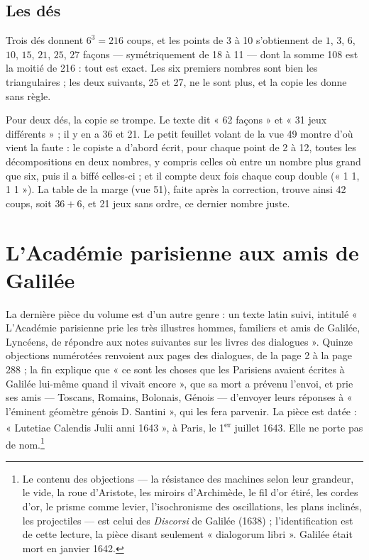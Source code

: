 \documentclass[11pt,a4paper]{article}
\begin{document}
\subsection*{Les dés}

Trois dés donnent $6^3 = 216$ coups, et les points de 3 à 10 s'obtiennent de
$1$, $3$, $6$, $10$, $15$, $21$, $25$, $27$ façons — symétriquement de 18 à 11 — dont la somme
108 est la moitié de 216 : tout est exact. Les six premiers nombres sont bien
les triangulaires ; les deux suivants, 25 et 27, ne le sont plus, et la copie
les donne sans règle.

Pour deux dés, la copie se trompe. Le texte dit « 62 façons » et « 31 jeux
différents » ; il y en a 36 et 21. Le petit feuillet volant de la vue 49 montre
d'où vient la faute : le copiste a d'abord écrit, pour chaque point de 2 à 12,
toutes les décompositions en deux nombres, y compris celles où entre un nombre
plus grand que six, puis il a biffé celles-ci ; et il compte deux fois chaque
coup double (« 1 1, 1 1 »). La table de la marge (vue 51), faite après la
correction, trouve ainsi 42 coups, soit $36 + 6$, et 21 jeux sans ordre, ce
dernier nombre juste.

\section*{L'Académie parisienne aux amis de Galilée}

La dernière pièce du volume est d'un autre genre : un texte latin suivi,
intitulé « L'Académie parisienne prie les très illustres hommes, familiers et
amis de Galilée, Lyncéens, de répondre aux notes suivantes sur les livres des
dialogues ». Quinze objections numérotées renvoient aux pages des dialogues, de
la page 2 à la page 288 ; la fin explique que « ce sont les choses que les
Parisiens avaient écrites à Galilée lui-même quand il vivait encore », que sa mort
a prévenu l'envoi, et prie ses amis — Toscans, Romains, Bolonais, Génois — d'envoyer
leurs réponses à « l'éminent géomètre génois D. Santini », qui les fera
parvenir. La pièce est datée : « Lutetiae Calendis Julii anni 1643 », à Paris,
le 1\textsuperscript{er} juillet 1643. Elle ne porte pas de nom.\footnote{Le
contenu des objections — la résistance des machines selon leur grandeur, le
vide, la roue d'Aristote, les miroirs d'Archimède, le fil d'or étiré, les cordes
d'or, le prisme comme levier, l'isochronisme des oscillations, les plans
inclinés, les projectiles — est celui des \emph{Discorsi} de Galilée (1638) ;
l'identification est de cette lecture, la pièce disant seulement « dialogorum
libri ». Galilée était mort en janvier 1642.}
\end{document}
